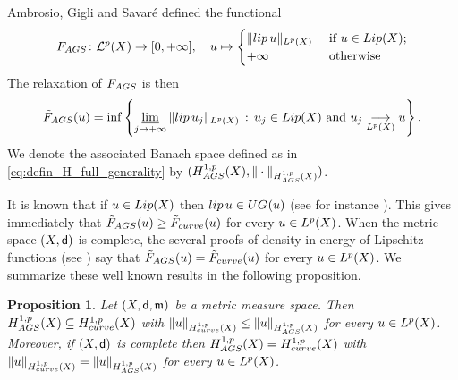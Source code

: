 \documentclass[12pt]{amsart}
\newcommand{\sfd}{{\sf d}}
\newcommand{\limi}{\varliminf}
\newcommand{\X}{{\rm X}}
\newcommand{\lip}{{\rm lip}}
\newcommand{\Lip}{{\rm Lip}}
\newcommand{\mm}{\mathfrak m}
\newcommand{\F}{{\rm F}}
\newtheorem{proposition}[theorem]{Proposition}
\theoremstyle{definition}
\newcommand{\UG}[1]{{\rm UG}^{#1}}
\newcommand{\calL}[1]{\mathcal{L}^{#1}}
\newcommand{\HH}[2]{H^{1,#1}_{{\rm #2}}}
\renewcommand{\F}[1]{{\rm F}_{{\rm #1}}}
\newcommand{\relF}[1]{\tilde{\rm F}_{{\rm #1}}}
\begin{document}
Ambrosio, Gigli and Savaré defined the functional
\begin{equation}
    \label{eq:defin_F_AGS}
    \F{AGS}\colon \calL{p}(\X) \to [0,+\infty], \quad u\mapsto 
    \begin{cases}
        \Vert \lip\,u \Vert_{L^p(\X)} &\text{ if }u\in \Lip(\X);\\
        +\infty &\text{ otherwise}
    \end{cases}
\end{equation}
The relaxation of $\F{AGS}$ is then
\begin{equation}
    \label{eq:defin_relaxation_AGS}
    \relF{AGS}(u) = \inf\left\{ \limi_{j\to +\infty} \Vert \lip\,u_j \Vert_{L^p(\X)}\, : \, u_j \in \Lip(\X) \text{ and } u_j \underset{L^p(\X)}{\longrightarrow} u\right\}.
\end{equation}
We denote the associated Banach space defined as in \eqref{eq:defin_H_full_generality} by $(\HH{p}{AGS}(\X), \Vert \cdot \Vert_{\HH{p}{AGS}(\X)})$.

It is known that if $u\in \Lip(\X)$ then $\lip\,u \in \UG{}(u)$ (see for instance \cite[Lemma 6.2.6]{HKST15}). This gives immediately that $\relF{AGS}(u) \ge \relF{curve}(u)$ for every $u\in L^p(\X)$. When the metric space $(\X,\sfd)$ is complete, the several proofs of density in energy of Lipschitz functions (see \cite{AmbrosioGigliSavare11-3,AmbrosioDiMarino14,Eriksson-Bique-Density-in-energy,LucicPasqualetto2024}) say that $\relF{AGS}(u) = \relF{curve}(u)$ for every $u\in L^p(\X)$. We summarize these well known results in the following proposition.
\begin{proposition}
\label{prop:AGS=curve_complete}
    Let $(\X,\sfd,\mm)$ be a metric measure space. Then $\HH{p}{AGS}(\X) \subseteq \HH{p}{curve}(\X)$ with $\Vert u \Vert_{\HH{p}{curve}(\X)} \le \Vert u \Vert_{\HH{p}{AGS}(\X)}$ for every $u \in L^p(\X)$. Moreover, if $(\X,\sfd)$ is complete then $\HH{p}{AGS}(\X) = \HH{p}{curve}(\X)$ with $\Vert u \Vert_{\HH{p}{curve}(\X)} = \Vert u \Vert_{\HH{p}{AGS}(\X)}$ for every $u \in L^p(\X)$.
\end{proposition}
\end{document}
